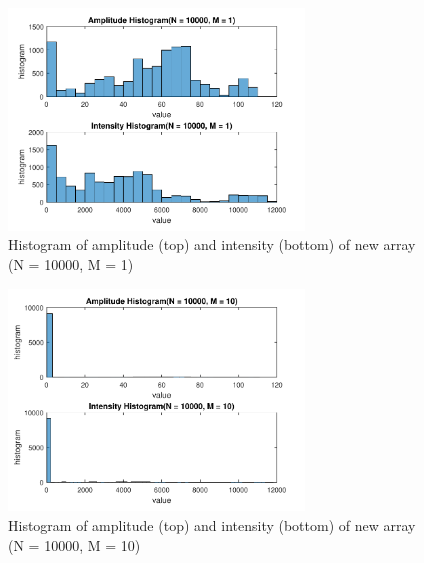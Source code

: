 \documentclass{article}
\begin{document}
\begin{figure}[H]
	\centering
	\includegraphics[width = 0.7\textwidth]{src/2pi/hist_10000_1.pdf}
	\caption{Histogram of amplitude (top) and intensity (bottom) of new array (N = 10000, M = 1)}
	\label{fig:hist-10000-1}
\end{figure}
\begin{figure}[H]
	\centering
	\includegraphics[width = 0.7\textwidth]{src/2pi/hist_10000_10.pdf}
	\caption{Histogram of amplitude (top) and intensity (bottom) of new array (N = 10000, M = 10)}
	\label{fig:hist-10000-10}
\end{figure}
\end{document}
